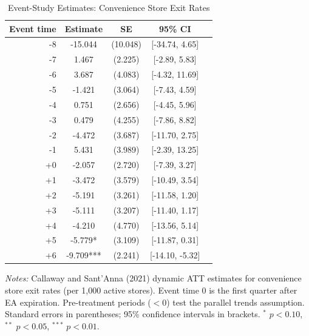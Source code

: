 \begin{table}[htbp]
\centering
\caption{Event-Study Estimates: Convenience Store Exit Rates}
\label{tab:eventstudy}
\begin{tabular}{rcccc}
\toprule
Event time & Estimate & SE & 95\% CI & \\
\midrule
-8 & -15.044 & (10.048) & [-34.74, 4.65] \\
-7 & 1.467 & (2.225) & [-2.89, 5.83] \\
-6 & 3.687 & (4.083) & [-4.32, 11.69] \\
-5 & -1.421 & (3.064) & [-7.43, 4.59] \\
-4 & 0.751 & (2.656) & [-4.45, 5.96] \\
-3 & 0.479 & (4.255) & [-7.86, 8.82] \\
-2 & -4.472 & (3.687) & [-11.70, 2.75] \\
-1 & 5.431 & (3.989) & [-2.39, 13.25] \\
\midrule
+0 & -2.057 & (2.720) & [-7.39, 3.27] \\
+1 & -3.472 & (3.579) & [-10.49, 3.54] \\
+2 & -5.191 & (3.261) & [-11.58, 1.20] \\
+3 & -5.111 & (3.207) & [-11.40, 1.17] \\
+4 & -4.210 & (4.770) & [-13.56, 5.14] \\
+5 & -5.779* & (3.109) & [-11.87, 0.31] \\
+6 & -9.709*** & (2.241) & [-14.10, -5.32] \\
\bottomrule
\end{tabular}
\begin{tablenotes}
\item \textit{Notes:} Callaway and Sant'Anna (2021) dynamic ATT estimates for convenience store
exit rates (per 1,000 active stores). Event time 0 is the first quarter after EA expiration.
Pre-treatment periods ($< 0$) test the parallel trends assumption.
Standard errors in parentheses; 95\% confidence intervals in brackets.
$^{*}$ $p < 0.10$, $^{**}$ $p < 0.05$, $^{***}$ $p < 0.01$.
\end{tablenotes}
\end{table}
